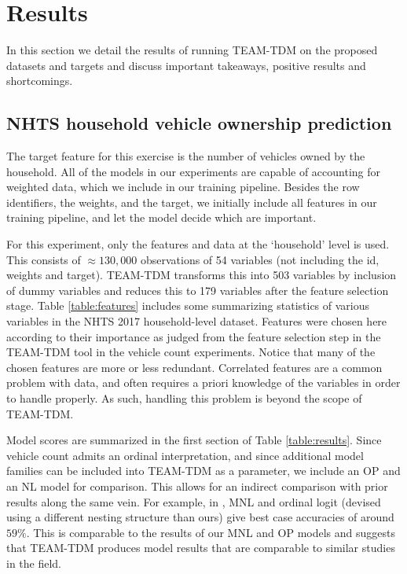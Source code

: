 \documentclass[numbered]{trbunofficial}
\begin{document}
\section{Results} \label{section:results}

In this section we detail the results of running TEAM-TDM on the proposed datasets and targets and discuss important takeaways, positive results and shortcomings.

\subsection{NHTS household vehicle ownership prediction}\label{subsection:vehicle}

The target feature for this exercise is the number of vehicles owned by the household.
 All of the models in our experiments are capable of accounting for weighted data, which we include in our training pipeline.
 Besides the row identifiers, the weights, and the target, we initially include all features in our training pipeline, and let the model decide which are important.
 
For this experiment, only the features and data at the `household' level is used.
 This consists of $\approx 130,000$ observations of 54 variables (not including the id, weights and target).
 TEAM-TDM transforms this into 503 variables by inclusion of dummy variables and reduces this to 179 variables after the feature selection stage.
 Table \ref{table:features} includes some summarizing statistics of various variables in the NHTS 2017 household-level dataset.
 Features were chosen here according to their importance as judged from the feature selection step in the TEAM-TDM tool in the vehicle count experiments.
 Notice that many of the chosen features are more or less redundant.
 Correlated features are a common problem with data, and often requires a priori knowledge of the variables in order to handle properly.
 As such, handling this problem is beyond the scope of TEAM-TDM.

Model scores are summarized in the first section of Table \ref{table:results}.
 Since vehicle count admits an ordinal interpretation, and since additional model families can be included into TEAM-TDM as a parameter, we include an OP and an NL model for comparison.
 This allows for an indirect comparison with prior results along the same vein.
 For example, in , MNL and ordinal logit (devised using a different nesting structure than ours) give best case accuracies of around $59\%$.
 This is comparable to the results of our MNL and OP models and suggests that TEAM-TDM produces model results that are comparable to similar studies in the field.
\end{document}
